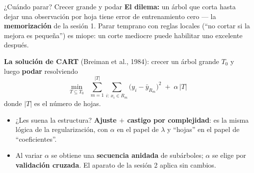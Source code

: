 \documentclass{beamer}
\newcommand{\1}{\mathbb{I}}
\begin{document}
\begin{frame}{¿Cuándo parar? Crecer grande y podar}
\small
\textbf{El dilema:} un árbol que corta hasta dejar una observación por hoja tiene error de entrenamiento cero --- la \textbf{memorización} de la sesión 1. Parar temprano con reglas locales (``no cortar si la mejora es pequeña'') es miope: un corte mediocre puede habilitar uno excelente después.
\pause

\vspace{0.2cm}
\textbf{La solución de CART} (Breiman et al., 1984): crecer un árbol grande $T_0$ y luego \textbf{podar} resolviendo
\[ \min_{T \subseteq T_0} \;\; \sum_{m=1}^{|T|} \sum_{i:\, x_i \in R_m} \big( y_i - \bar{y}_{R_m} \big)^2 \;+\; \alpha\, |T| \]
donde $|T|$ es el número de hojas.
\pause

\begin{itemize}\itemsep4pt
  \item ¿Les suena la estructura? \textbf{Ajuste $+$ castigo por complejidad}: es la misma lógica de la regularización, con $\alpha$ en el papel de $\lambda$ y ``hojas'' en el papel de ``coeficientes''.
  \item Al variar $\alpha$ se obtiene una \textbf{secuencia anidada} de subárboles; $\alpha$ se elige por \textbf{validación cruzada}. El aparato de la sesión 2 aplica sin cambios.
\end{itemize}
\end{frame}
\end{document}
